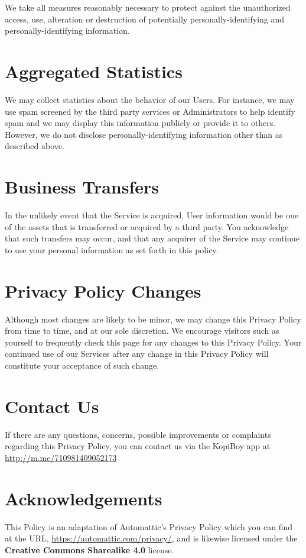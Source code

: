 \documentclass[11pt]{article}
\begin{document}
We take all measures reasonably necessary to protect against the unauthorized access,
use, alteration or destruction of potentially personally-identifying and
personally-identifying information.

\section{Aggregated Statistics}

We may collect statistics about the behavior of our Users. For instance, we may 
use spam screened by the third party services or Administrators to help identify spam
and we may display this information publicly or provide it to others. However, we do 
not disclose personally-identifying information other than as described above.

\section{Business Transfers}

In the unlikely event that the Service is acquired, User information would
be one of the assets that is transferred or acquired by a third party. You acknowledge
that such transfers may occur, and that any acquirer of the Service may continue to use
your personal information as set forth in this policy.

\section{Privacy Policy Changes}

Although most changes are likely to be minor, we may change this Privacy Policy from
time to time, and at our sole discretion. We encourage visitors such as yourself to
frequently check this page for any changes to this Privacy Policy. Your continued use of
our Services after any change in this Privacy Policy will constitute your acceptance of
such change.

\section{Contact Us}

If there are any questions, concerns, possible improvements or complaints regarding
this Privacy Policy, you can contact us via the KopiBoy app at \url{http://m.me/710981409052173}

\section{Acknowledgements}

This Policy is an adaptation of Automattic's Privacy Policy which you can find
at the URL, \url{https://automattic.com/privacy/}, and is likewise licensed under the
\textbf{Creative Commons Sharealike 4.0} license.
\end{document}
